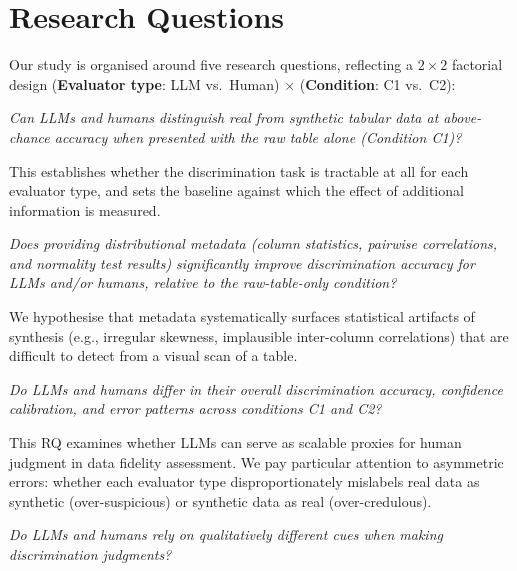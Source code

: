 \documentclass[runningheads]{llncs}
\begin{document}
\section{Research Questions}
\label{sec:rqs}

Our study is organised around five research questions, reflecting a
$2 \times 2$ factorial design (\textbf{Evaluator type}: LLM vs.\ Human)
$\times$ (\textbf{Condition}: C1 vs.\ C2):

\begin{description}[leftmargin=0pt,itemsep=6pt]

  \item[\textbf{RQ1} --- Baseline Discriminability.]
    \emph{Can LLMs and humans distinguish real from synthetic tabular
    data at above-chance accuracy when presented with the raw table
    alone (Condition C1)?}

    This establishes whether the discrimination task is tractable at
    all for each evaluator type, and sets the baseline against which
    the effect of additional information is measured.

  \item[\textbf{RQ2} --- Effect of Metadata (C1 vs.\ C2).]
    \emph{Does providing distributional metadata (column statistics,
    pairwise correlations, and normality test results) significantly
    improve discrimination accuracy for LLMs and/or humans, relative
    to the raw-table-only condition?}

    We hypothesise that metadata systematically surfaces statistical
    artifacts of synthesis (e.g., irregular skewness, implausible
    inter-column correlations) that are difficult to detect from a
    visual scan of a table.

  \item[\textbf{RQ3} --- LLM vs.\ Human Comparison.]
    \emph{Do LLMs and humans differ in their overall discrimination
    accuracy, confidence calibration, and error patterns across
    conditions C1 and C2?}

    This RQ examines whether LLMs can serve as scalable proxies for
    human judgment in data fidelity assessment.
    We pay particular attention to asymmetric errors: whether each
    evaluator type disproportionately mislabels real data as synthetic
    (over-suspicious) or synthetic data as real (over-credulous).

  \item[\textbf{RQ4} --- Cue Utilisation.]
    \emph{Do LLMs and humans rely on qualitatively different cues when
    making discrimination judgments?}


\end{description}
\end{document}
